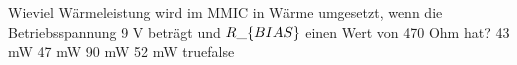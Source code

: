     {Wieviel Wärmeleistung wird im MMIC in Wärme umgesetzt, wenn die Betriebsspannung 9 V beträgt und $R\_\text\{BIAS\}$ einen Wert von 470 Ohm hat?}
    {43 mW}
    {47 mW}
    {90 mW}
    {52 mW}
    {true}{false}